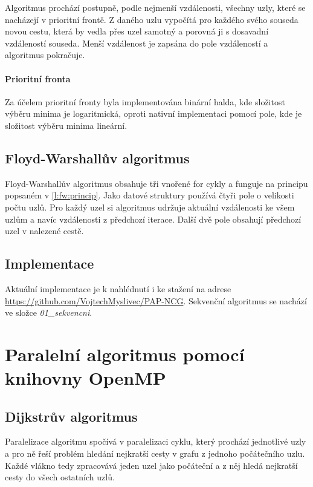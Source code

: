 Algoritmus prochází postupně, podle nejmenší vzdálenosti, všechny uzly, které se nacházejí v prioritní frontě. Z daného uzlu vypočítá pro každého svého souseda novou cestu, která by vedla přes uzel samotný a porovná ji s dosavadní vzdáleností souseda. Menší vzdálenost je zapsána do pole vzdáleností a algoritmus pokračuje.

\paragraph{Prioritní fronta} \label{l:dij:fron}
Za účelem prioritní fronty byla implementována binární halda, kde složitost výběru minima je logaritmická, oproti nativní implementaci pomocí pole, kde je složitost výběru minima lineární.


\subsection{Floyd-Warshallův algoritmus}
Floyd-Warshallův algoritmus obsahuje tři vnořené for cykly a funguje na principu popsaném v \ref{l:fw:princip}. Jako datové struktury používá čtyři pole o velikosti počtu uzlů. Pro každý uzel si algoritmus udržuje aktuální vzdálenosti ke všem uzlům a navíc vzdálenosti z předchozí iterace. Další dvě pole obsahují předchozí uzel v nalezené cestě. 

\subsection{Implementace}
Aktuální implementace je k nahlédnutí i ke stažení na adrese \url{https://github.com/VojtechMyslivec/PAP-NCG}. Sekvenční algoritmus se nachází ve složce \textit{01\_sekvencni}.


\section{Paralelní algoritmus pomocí knihovny OpenMP}

\subsection{Dijkstrův algoritmus}
Paralelizace algoritmu spočívá v paralelizaci cyklu, který prochází jednotlivé uzly a pro ně řeší problém hledání nejkratší cesty v grafu z jednoho počátečního uzlu. Každé vlákno tedy zpracovává jeden uzel jako počáteční a z něj hledá nejkratší cesty do všech ostatních uzlů.

